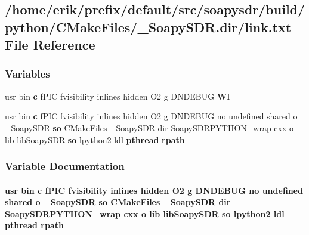\subsection{/home/erik/prefix/default/src/soapysdr/build/python/\+C\+Make\+Files/\+\_\+\+Soapy\+S\+DR.dir/link.txt File Reference}
\label{soapysdr_2build_2python_2CMakeFiles_2__SoapySDR_8dir_2link_8txt}
\subsubsection*{Variables}
\begin{DoxyCompactItemize}
\item 
usr bin {\bf c} f\+P\+IC fvisibility inlines hidden O2 g D\+N\+D\+E\+B\+UG {\bf Wl}
\item 
usr bin {\bf c} f\+P\+IC fvisibility inlines hidden O2 g D\+N\+D\+E\+B\+UG no undefined shared o \+\_\+\+Soapy\+S\+DR {\bf so} C\+Make\+Files \+\_\+\+Soapy\+S\+DR dir Soapy\+S\+D\+R\+P\+Y\+T\+H\+O\+N\+\_\+wrap cxx o lib lib\+Soapy\+S\+DR {\bf so} lpython2 ldl {\bf pthread} {\bf rpath}
\end{DoxyCompactItemize}


\subsubsection{Variable Documentation}
\paragraph[{rpath}]{\setlength{\rightskip}{0pt plus 5cm}usr bin {\bf c} f\+P\+IC fvisibility inlines hidden O2 g D\+N\+D\+E\+B\+UG no undefined shared o \+\_\+\+Soapy\+S\+DR {\bf so} C\+Make\+Files \+\_\+\+Soapy\+S\+DR dir Soapy\+S\+D\+R\+P\+Y\+T\+H\+O\+N\+\_\+wrap cxx o lib lib\+Soapy\+S\+DR {\bf so} lpython2 ldl {\bf pthread} rpath}\label{soapysdr_2build_2python_2CMakeFiles_2__SoapySDR_8dir_2link_8txt_a62e4302b583a512caf007287af979218}


